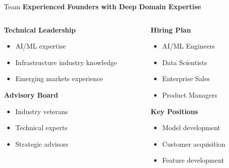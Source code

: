 \documentclass[aspectratio=169]{beamer}
\begin{document}
\begin{frame}{Team}
    \textbf{Experienced Founders with Deep Domain Expertise}
    
    \vspace{0.5cm}
    \begin{columns}
        \begin{column}{0.5\textwidth}
            \textbf{Technical Leadership}
            \begin{itemize}
                \item AI/ML expertise
                \item Infrastructure industry knowledge
                \item Emerging markets experience
            \end{itemize}
            
            \vspace{0.5cm}
            \textbf{Advisory Board}
            \begin{itemize}
                \item Industry veterans
                \item Technical experts
                \item Strategic advisors
            \end{itemize}
        \end{column}
        \begin{column}{0.5\textwidth}
            \textbf{Hiring Plan}
            \begin{itemize}
                \item AI/ML Engineers
                \item Data Scientists
                \item Enterprise Sales
                \item Product Managers
            \end{itemize}
            
            \vspace{0.5cm}
            \textbf{Key Positions}
            \begin{itemize}
                \item Model development
                \item Customer acquisition
                \item Feature development
            \end{itemize}
        \end{column}
    \end{columns}
\end{frame}
\end{document}
